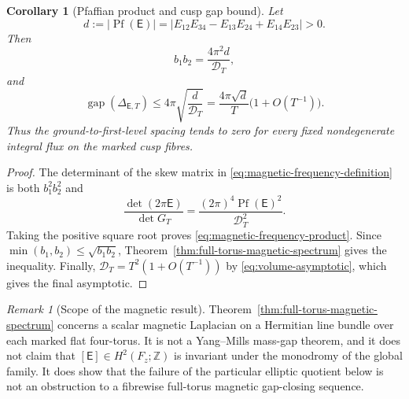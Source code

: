 \documentclass[11pt]{article}
\numberwithin{equation}{section}
\newtheorem{corollary}[theorem]{Corollary}
\theoremstyle{definition}
\theoremstyle{remark}
\newtheorem{remark}[theorem]{Remark}
\newcommand{\Z}{\mathbb Z}
\begin{document}
\begin{corollary}[Pfaffian product and cusp gap bound]
\label{cor:full-torus-magnetic-gap}
Let
\begin{equation}\label{eq:magnetic-pfaffian}
 d:=|\operatorname{Pf}(\mathsf E)|
 =|E_{12}E_{34}-E_{13}E_{24}+E_{14}E_{23}|>0.
\end{equation}
Then
\begin{equation}\label{eq:magnetic-frequency-product}
 b_1b_2=\frac{4\pi^2d}{\mathcal D_T},
\end{equation}
and
\begin{equation}\label{eq:full-torus-magnetic-gap-bound}
 \boxed{
 \operatorname{gap}(\Delta_{\mathsf E,T})
 \le4\pi\sqrt{\frac d{\mathcal D_T}}
 =\frac{4\pi\sqrt d}{T}\bigl(1+O(T^{-1})\bigr).}
\end{equation}
Thus the ground-to-first-level spacing tends to zero for every fixed
nondegenerate integral flux on the marked cusp fibres.
\end{corollary}

\begin{proof}
The determinant of the skew matrix in
\eqref{eq:magnetic-frequency-definition} is both $b_1^2b_2^2$ and
\[
 \frac{\det(2\pi\mathsf E)}{\det G_T}
 =\frac{(2\pi)^4\operatorname{Pf}(\mathsf E)^2}{\mathcal D_T^2}.
\]
Taking the positive square root proves
\eqref{eq:magnetic-frequency-product}.  Since
$\min(b_1,b_2)\le\sqrt{b_1b_2}$, Theorem~\ref{thm:full-torus-magnetic-spectrum}
gives the inequality.  Finally,
$\mathcal D_T=T^2(1+O(T^{-1}))$ by
\eqref{eq:volume-asymptotic}, which gives the final asymptotic.
\end{proof}

\begin{remark}[Scope of the magnetic result]
Theorem~\ref{thm:full-torus-magnetic-spectrum} concerns a scalar magnetic
Laplacian on a Hermitian line bundle over each marked flat four-torus.  It is
not a Yang--Mills mass-gap theorem, and it does not claim that
$[\mathsf E]\in H^2(F_z;\Z)$ is invariant under the monodromy of the global
family.  It does show that the failure of the particular elliptic quotient
below is not an obstruction to a fibrewise full-torus magnetic gap-closing
sequence.
\end{remark}







\end{document}

